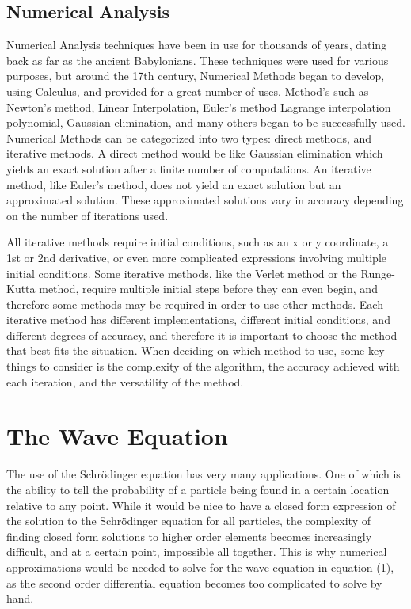 \documentclass{article}
\begin{document}
\begin{multicols}{2}
\subsection{Numerical Analysis}
Numerical Analysis techniques have been in use for thousands of years, dating back as far as the ancient Babylonians. These techniques were used for various purposes, but around the 17th century, Numerical Methods began to develop, using Calculus, and provided for a great number of uses. Method's such as Newton's method, Linear Interpolation,  Euler's method Lagrange interpolation polynomial, Gaussian elimination, and many others began to be successfully used. Numerical Methods can be categorized into two types: direct methods, and iterative methods. A direct method would be like Gaussian elimination which yields an exact solution after a finite number of computations. An iterative method, like Euler's method, does not yield an exact solution but an approximated solution. These approximated solutions vary in accuracy depending on the number of iterations used.

All iterative methods require initial conditions, such as an x or y coordinate, a 1st or 2nd derivative, or even more complicated expressions involving multiple initial conditions. Some iterative methods, like the Verlet method or the Runge-Kutta method, require multiple initial steps before they can even begin, and therefore some methods may be required in order to use other methods. Each iterative method has different implementations, different initial conditions, and different degrees of accuracy, and therefore it is important to choose the method that best fits the situation. When deciding on which method to use, some key things to consider is the complexity of the algorithm, the accuracy achieved with each iteration, and the versatility of the method.


\section{The Wave Equation}
The use of the Schrödinger equation has very many applications. One of which is the ability to tell the probability of a particle being found in a certain location relative to any point. While it would be nice to have a closed form expression of the solution to the Schrödinger equation for all particles, the complexity of finding closed form solutions to higher order elements becomes increasingly difficult, and at a certain point, impossible all together. This is why numerical approximations would be needed to solve for the wave equation in equation (1), as the second order differential equation becomes too complicated to solve by hand.


\end{multicols}
\end{document}
